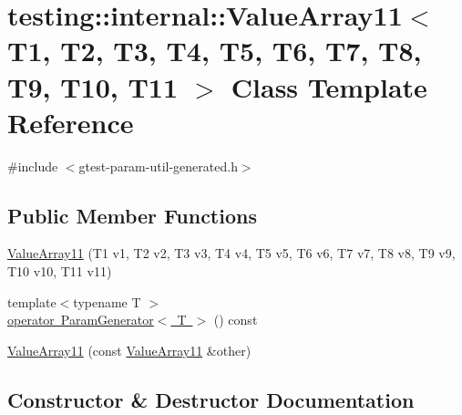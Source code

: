 \hypertarget{classtesting_1_1internal_1_1ValueArray11}{}\section{testing\+::internal\+::Value\+Array11$<$ T1, T2, T3, T4, T5, T6, T7, T8, T9, T10, T11 $>$ Class Template Reference}
\label{classtesting_1_1internal_1_1ValueArray11}


{\ttfamily \#include $<$gtest-\/param-\/util-\/generated.\+h$>$}

\subsection*{Public Member Functions}
\begin{DoxyCompactItemize}
\item 
\mbox{\hyperlink{classtesting_1_1internal_1_1ValueArray11_a2b26f49e7c5856e86f4fae360cd22d47}{Value\+Array11}} (T1 v1, T2 v2, T3 v3, T4 v4, T5 v5, T6 v6, T7 v7, T8 v8, T9 v9, T10 v10, T11 v11)
\item 
{\footnotesize template$<$typename T $>$ }\\\mbox{\hyperlink{classtesting_1_1internal_1_1ValueArray11_a3042498fcde8d1c91df474e618416f28}{operator Param\+Generator$<$ T $>$}} () const
\item 
\mbox{\hyperlink{classtesting_1_1internal_1_1ValueArray11_a09b4890b05313d04d98cbb5507d9b34e}{Value\+Array11}} (const \mbox{\hyperlink{classtesting_1_1internal_1_1ValueArray11}{Value\+Array11}} \&other)
\end{DoxyCompactItemize}


\subsection{Constructor \& Destructor Documentation}
\mbox{\label{classtesting_1_1internal_1_1ValueArray11_a2b26f49e7c5856e86f4fae360cd22d47}} 
